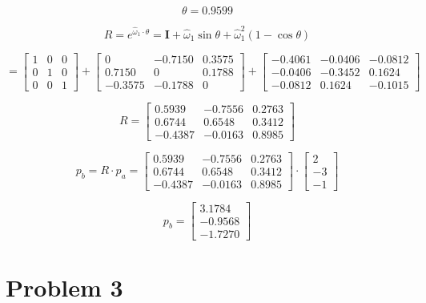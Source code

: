 \documentclass[10pt, oneside, letter]{article}
\begin{document}
		$$\theta = 0.9599$$
		
		$$R =  e^{\hat{\omega}_1 \cdot \theta} = \mathbf{I} +\hat{\omega}_1 \sin{\theta} + \hat{\omega}_{1}^2(1 - \cos{\theta})$$ 
	
		$$= \left[ \begin{array}{ccc}
		  1 & 0 & 0 \\
		  0 & 1 & 0 \\
		  0 & 0 & 1
		\end{array} \right] + \left[ \begin{array}{ccc}
		  0 & -0.7150 & 0.3575 \\
		  0.7150 & 0 & 0.1788 \\
		  -0.3575 & -0.1788 & 0
		\end{array} \right] + \left[ \begin{array}{ccc}
		  -0.4061 & -0.0406 & -0.0812 \\
		  -0.0406 & -0.3452 & 0.1624 \\
		  -0.0812 & 0.1624 & -0.1015
		\end{array} \right] $$
	
		$$R = \left[ \begin{array}{ccc}
		  0.5939 & -0.7556 & 0.2763 \\
		  0.6744 & 0.6548 & 0.3412 \\
		  -0.4387 & -0.0163 & 0.8985
		\end{array} \right]$$ 
		
		$$p_b = R \cdot p_a = \left[ \begin{array}{ccc}
		 0.5939 & -0.7556 & 0.2763 \\
	     0.6744 & 0.6548 & 0.3412 \\
		 -0.4387 & -0.0163 & 0.8985
		\end{array} \right] \cdot \left[ \begin{array}{r}
		  2 \\
		  -3 \\
		  -1
		\end{array} \right]$$
	
		$$\boxed{p_b = 
		\left[ \begin{array}{r}
		  3.1784 \\
		  -0.9568 \\
		  -1.7270
		\end{array} \right] }$$
	
\section*{Problem 3}
\end{document}
